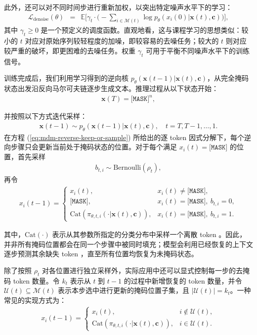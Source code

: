 \noindent 此外，还可以对不同时间步进行重新加权，以突出特定噪声水平下的学习：
\begin{eqnarray}
\mathcal{L}_{\text{denoise}}(\theta)
& = &
\mathbb{E}\Bigg[
\gamma_t \cdot
\Big(-\sum_{i\in \mathcal{M}(t)} \log p_\theta(x_i(0)| \mathbf{x}(t),\mathbf{c})\Big)
\Bigg],
\label{eq:mdm-denoise-ce-weighted}
\end{eqnarray}
其中 $\gamma_t\ge 0$ 是一个预定义的调度函数。直观地看，这与课程学习的思想类似：较小的 $t$ 对应对原始序列较轻程度的加噪，即较容易的去噪任务；较大的 $t$ 则对应较严重的破坏，即更困难的去噪任务。权重 $\gamma_t$ 可用于平衡不同噪声水平下的训练信号。

训练完成后，我们利用学习得到的逆向核 $p_\theta(\mathbf{x}(t-1)| \mathbf{x}(t),\mathbf{c})$，从完全掩码状态出发沿反向马尔可夫链逐步生成文本。推理过程从以下状态开始：
\begin{eqnarray}
\mathbf{x}(T) = \texttt{[MASK]}^n,
\end{eqnarray}

\noindent 并按照以下方式迭代采样：
\begin{eqnarray}
\mathbf{x}(t-1) \sim p_\theta(\mathbf{x}(t-1)| \mathbf{x}(t),\mathbf{c}), \quad t=T,T-1,\dots,1.
\label{eq:mdm-sampling-chain}
\end{eqnarray}
在方程 (\ref{eq:mdm-reverse-keep-or-sample}) 所给出的逐 token 因式分解下，每个逆向步骤只会更新当前处于掩码状态的位置。对于每个满足 $x_i(t)=\texttt{[MASK]}$ 的位置，首先采样
\begin{eqnarray}
b_{t,i}\sim\mathrm{Bernoulli}(\rho_t),
\end{eqnarray}
再令
\begin{eqnarray}
x_i(t-1) =
\begin{cases}
x_i(t), & x_i(t)\neq \texttt{[MASK]},\\
\texttt{[MASK]}, & x_i(t)=\texttt{[MASK]},\ b_{t,i}=0,\\
\mathrm{Cat}\!\left(\pi_{\theta,t,i}( \cdot | \mathbf{x}(t),\mathbf{c})\right),
& x_i(t)=\texttt{[MASK]},\ b_{t,i}=1.
\end{cases}
\end{eqnarray}

\noindent 其中，$\mathrm{Cat}(\cdot)$ 表示从其参数所指定的分类分布中采样一个离散 token 。因此，并非所有掩码位置都会在同一个步骤中被同时填充；模型会利用已经恢复的上下文逐步预测其余缺失 token ，直至所有位置均恢复为未掩码状态。

除了按照 $\rho_t$ 对各位置进行独立采样外，实际应用中还可以显式控制每一步的去掩码 token 数量。令 $k_t$ 表示从 $t$ 到 $t-1$ 的过程中新增恢复的 token 数量，并令 $\mathcal{U}(t)\subseteq \mathcal{M}(t)$ 表示本步选中进行更新的掩码位置子集，且 $|\mathcal{U}(t)| = k_t$。一种常见的实现方式为：
\begin{eqnarray}
x_i(t-1) =
\begin{cases}
x_i(t), & i\notin \mathcal{U}(t),\\
\mathrm{Cat}\!\left(\pi_{\theta,t,i}(\cdot | \mathbf{x}(t),\mathbf{c})\right), & i\in \mathcal{U}(t).
\end{cases}
\label{eq:mdm-partial-update}
\end{eqnarray}

